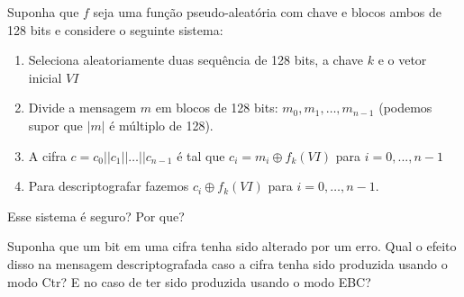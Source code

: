 \begin{exercicio}
  Suponha que $f$ seja uma função pseudo-aleatória com chave e blocos ambos de 128 bits e considere o seguinte sistema:
  \begin{enumerate}
  \item Seleciona aleatoriamente duas sequência de 128 bits, a chave $k$ e o vetor inicial $VI$
  \item Divide a mensagem $m$ em blocos de 128 bits: $m_0, m_1, \dots, m_{n-1}$ (podemos supor que $|m|$ é múltiplo de 128).
  \item A cifra $c = c_0 || c_1 || \dots || c_{n-1}$ é tal que $c_i = m_i \oplus f_k(VI)$ para $i = 0, ..., n-1$
  \item Para descriptografar fazemos $c_i \oplus f_k(VI)$ para $i = 0, \dots, n-1$.
  \end{enumerate}
  Esse sistema é seguro? Por que?
\end{exercicio}

\begin{exercicio}
Suponha que um bit em uma cifra tenha sido alterado por um erro.
Qual o efeito disso na mensagem descriptografada caso a cifra tenha sido produzida usando o modo Ctr? E no caso de ter sido produzida usando o modo EBC?  
\end{exercicio}



